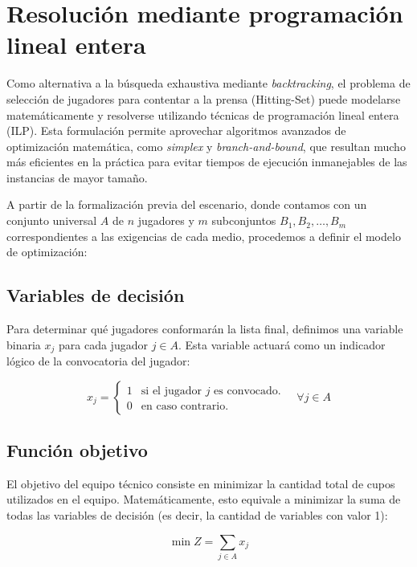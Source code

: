 \section{Resolución mediante programación lineal entera}

Como alternativa a la búsqueda exhaustiva mediante \textit{backtracking}, el problema de selección de jugadores para contentar a la prensa (Hitting-Set) puede modelarse matemáticamente y resolverse utilizando técnicas de programación lineal entera (ILP). Esta formulación permite aprovechar algoritmos avanzados de optimización matemática, como \textit{simplex} y \textit{branch-and-bound}, que resultan mucho más eficientes en la práctica para evitar tiempos de ejecución inmanejables de las instancias de mayor tamaño.

A partir de la formalización previa del escenario, donde contamos con un conjunto universal $A$ de $n$ jugadores y $m$ subconjuntos $B_1, B_2, \dots, B_m$ correspondientes a las exigencias de cada medio, procedemos a definir el modelo de optimización:

\subsection*{Variables de decisión}
Para determinar qué jugadores conformarán la lista final, definimos una variable binaria $x_j$ para cada jugador $j \in A$. Esta variable actuará como un indicador lógico de la convocatoria del jugador:

\begin{equation}
    x_j = 
    \begin{cases} 
      1 & \text{si el jugador } j \text{ es convocado.} \\
      0 & \text{en caso contrario.}
   \end{cases}
   \quad \forall j \in A
\end{equation}

\subsection*{Función objetivo}
El objetivo del equipo técnico consiste en minimizar la cantidad total de cupos utilizados en el equipo. Matemáticamente, esto equivale a minimizar la suma de todas las variables de decisión (es decir, la cantidad de variables con valor 1):

\begin{equation}
    \min Z = \sum_{j \in A} x_j
\end{equation}


